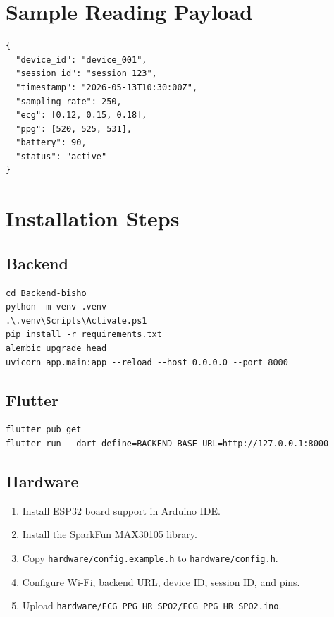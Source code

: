\section{Sample Reading Payload}

\begin{lstlisting}[caption={Sample ECG/PPG reading payload}]
{
  "device_id": "device_001",
  "session_id": "session_123",
  "timestamp": "2026-05-13T10:30:00Z",
  "sampling_rate": 250,
  "ecg": [0.12, 0.15, 0.18],
  "ppg": [520, 525, 531],
  "battery": 90,
  "status": "active"
}
\end{lstlisting}

\section{Installation Steps}

\subsection{Backend}

\begin{lstlisting}[caption={Backend setup}]
cd Backend-bisho
python -m venv .venv
.\.venv\Scripts\Activate.ps1
pip install -r requirements.txt
alembic upgrade head
uvicorn app.main:app --reload --host 0.0.0.0 --port 8000
\end{lstlisting}

\subsection{Flutter}

\begin{lstlisting}[caption={Flutter setup}]
flutter pub get
flutter run --dart-define=BACKEND_BASE_URL=http://127.0.0.1:8000
\end{lstlisting}

\subsection{Hardware}

\begin{enumerate}[leftmargin=*]
    \item Install ESP32 board support in Arduino IDE.
    \item Install the SparkFun MAX30105 library.
    \item Copy \texttt{hardware/config.example.h} to \texttt{hardware/config.h}.
    \item Configure Wi-Fi, backend URL, device ID, session ID, and pins.
    \item Upload \texttt{hardware/ECG\_PPG\_HR\_SPO2/ECG\_PPG\_HR\_SPO2.ino}.
\end{enumerate}

